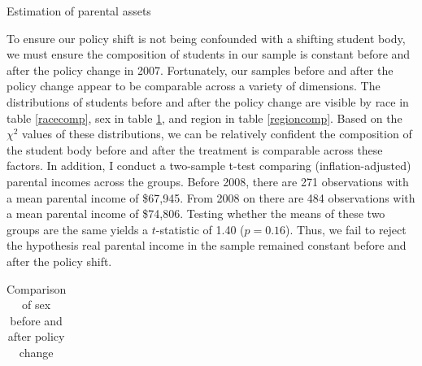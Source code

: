 \documentclass[12pt]{article}
\begin{document}
	\begin{table}
		\centering
		\caption{Estimation of parental assets}
		
		\label{assetTab}
	\end{table}

	To ensure our policy shift is not being confounded with a shifting student body, we must ensure the composition of students in our sample is constant before and after the policy change in 2007. Fortunately, our samples before and after the policy change appear to be comparable across a variety of dimensions. The distributions of students before and after the policy change are visible by race in table \ref{racecomp}, sex in table \ref{sexcomp}, and region in table \ref{regioncomp}. Based on the $\chi^2$ values of these distributions, we can be relatively confident the composition of the student body before and after the treatment is comparable across these factors. In addition, I conduct a two-sample t-test comparing (inflation-adjusted) parental incomes across the groups. Before 2008, there are 271 observations with a mean parental income of \$67,945. From 2008 on there are 484 observations with a mean parental income of \$74,806. Testing whether the means of these two groups are the same yields a $t$-statistic of 1.40 ($p = 0.16$). Thus, we fail to reject the hypothesis real parental income in the sample remained constant before and after the policy shift. 
	
{
	\begin{table}
		\centering
		\caption{Comparison of race before and after policy change}
		\label{racecomp}
	\end{table}

	\begin{table}
		\small
		\centering
		\caption{Comparison of sex before and after policy change}
		\begin{tabular}{lrrrrrr}
			
		\end{tabular}
		\label{sexcomp}
	\end{table}

	\begin{table}
		\centering
		\caption{Comparison of region before and after policy change}
		\label{regioncomp}
	\end{table}
}
	
\end{document}
